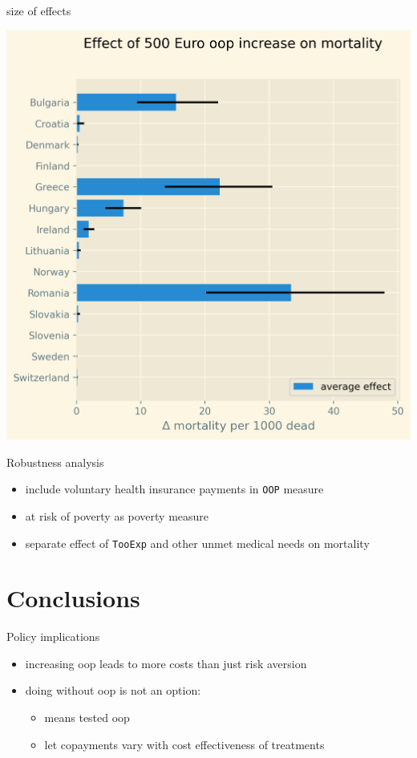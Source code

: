\documentclass[presentation]{beamer}
\begin{document}
\begin{frame}[label={sec:org71c7657}]{size of effects}
\begin{center}
\includegraphics[width=0.6\linewidth]{./figures/change_mortality_countries_baseline.png}
\label{fig:SummaryFigure}
\end{center}
\end{frame}




\begin{frame}[label={sec:org371db78},fragile]{Robustness analysis}
 \begin{itemize}
\item include voluntary health insurance payments in \texttt{OOP} measure
\item at risk of poverty as poverty measure
\item separate effect of \texttt{TooExp} and other unmet medical needs on mortality
\end{itemize}
\end{frame}



\section*{Conclusions}
\label{sec:org2554fad}

\begin{frame}[label={sec:org9e7d816}]{Policy implications}
\begin{itemize}
\item increasing oop leads to more costs than just risk aversion
\item doing without oop is not an option:
\begin{itemize}
\item means tested oop
\item let copayments vary with cost effectiveness of treatments
\end{itemize}
\end{itemize}
\end{frame}
\end{document}
